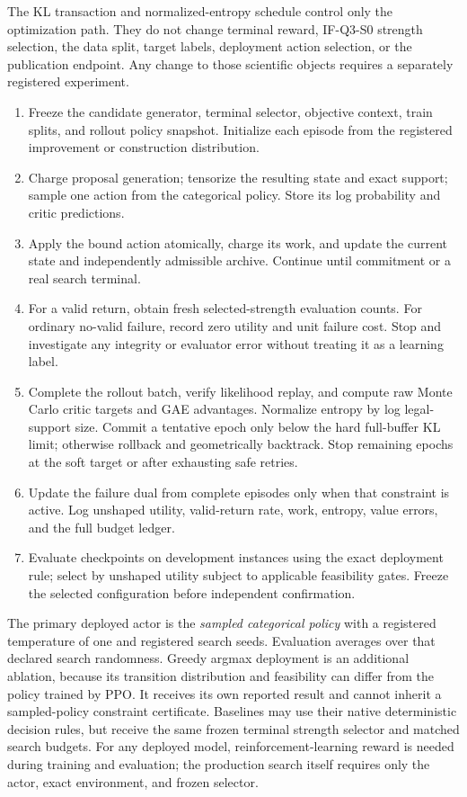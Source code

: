 The KL transaction and normalized-entropy schedule control only the optimization path. They do not
change terminal reward, IF-Q3-S0 strength selection, the data split, target labels, deployment
action selection, or the publication endpoint. Any change to those scientific objects requires a
separately registered experiment.

\begin{enumerate}
 \item Freeze the candidate generator, terminal selector, objective context, train splits, and
       rollout policy snapshot. Initialize each episode from the registered improvement or
       construction distribution.
 \item Charge proposal generation; tensorize the resulting state and exact support; sample one
       action from the categorical policy. Store its log probability and critic predictions.
 \item Apply the bound action atomically, charge its work, and update the current state and
       independently admissible archive. Continue until commitment or a real search terminal.
 \item For a valid return, obtain fresh selected-strength evaluation counts. For ordinary
       no-valid failure, record zero utility and unit failure cost. Stop and investigate any
       integrity or evaluator error without treating it as a learning label.
 \item Complete the rollout batch, verify likelihood replay, and compute raw Monte Carlo critic
       targets and GAE advantages. Normalize entropy by log legal-support size. Commit a tentative
       epoch only below the hard full-buffer KL limit; otherwise rollback and geometrically
       backtrack. Stop remaining epochs at the soft target or after exhausting safe retries.
 \item Update the failure dual from complete episodes only when that constraint is active. Log
       unshaped utility, valid-return rate, work, entropy, value errors, and the full budget ledger.
 \item Evaluate checkpoints on development instances using the exact deployment rule; select by
       unshaped utility subject to applicable feasibility gates. Freeze the selected configuration
       before independent confirmation.
\end{enumerate}

The primary deployed actor is the \emph{sampled categorical policy} with a registered temperature
of one and registered search seeds. Evaluation averages over that declared search randomness.
Greedy argmax deployment is an additional ablation, because its transition distribution and
feasibility can differ from the policy trained by PPO. It receives its own reported result and
cannot inherit a sampled-policy constraint certificate. Baselines may use their native deterministic
decision rules, but receive the same frozen terminal strength selector and matched search budgets.
For any deployed model, reinforcement-learning reward is needed during training and evaluation;
the production search itself requires only the actor, exact environment, and frozen selector.

